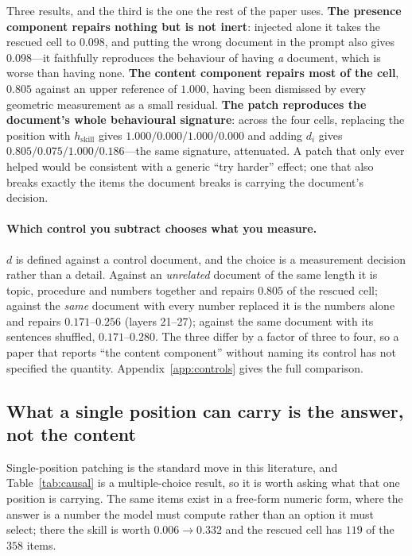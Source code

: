 \documentclass{article}
\newcommand{\dvec}{\ensuremath{d}}
\begin{document}
Three results, and the third is the one the rest of the paper uses.
\textbf{The presence component repairs nothing but is not inert}: injected
alone it takes the rescued cell to $0.098$, and putting the wrong document in
the prompt also gives $0.098$---it faithfully reproduces the behaviour of having
\emph{a} document, which is worse than having none. \textbf{The content
component repairs most of the cell}, $0.805$ against an upper reference of
$1.000$, having been dismissed by every geometric measurement as a small
residual. \textbf{The patch reproduces the document's whole behavioural
signature}: across the four cells, replacing the position with
$h_{\text{skill}}$ gives $1.000 / 0.000 / 1.000 / 0.000$ and adding $\dvec_i$
gives $0.805 / 0.075 / 1.000 / 0.186$---the same signature, attenuated. A patch
that only ever helped would be consistent with a generic ``try harder'' effect;
one that also breaks exactly the items the document breaks is carrying the
document's decision.

\paragraph{Which control you subtract chooses what you measure.} $\dvec$ is
defined against a control document, and the choice is a measurement decision
rather than a detail. Against an \emph{unrelated} document of the same length it
is topic, procedure and numbers together and repairs $0.805$ of the rescued
cell; against the \emph{same} document with every number replaced it is the
numbers alone and repairs $0.171$--$0.256$ (layers 21--27); against the same
document with its sentences shuffled, $0.171$--$0.280$. The three differ by a
factor of three to four, so a paper
that reports ``the content component'' without naming its control has not
specified the quantity. Appendix~\ref{app:controls} gives the full comparison.

\subsection{What a single position can carry is the answer, not the content}


Single-position patching is the standard move in this literature, and
Table~\ref{tab:causal} is a multiple-choice result, so it is worth asking what
that one position is carrying. The same items exist in a free-form numeric form,
where the answer is a number the model must compute rather than an option it
must select; there the skill is worth $0.006 \to 0.332$ and the rescued cell
has $119$ of the $358$ items.
\end{document}
